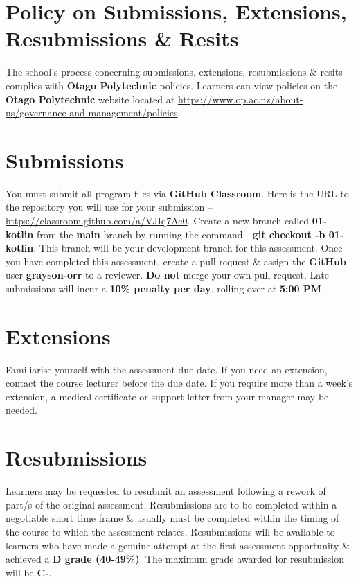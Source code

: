 \documentclass{article}
\begin{document}
\section*{Policy on Submissions, Extensions, Resubmissions \& Resits}
The school's process concerning submissions, extensions, resubmissions \& resits complies with \textbf{Otago Polytechnic} policies. Learners can view policies on the \textbf{Otago Polytechnic} website located at \href{https://www.op.ac.nz/about-us/governance-and-management/policies}{https://www.op.ac.nz/about-us/governance-and-management/policies}.

\section*{Submissions}
You must submit all program files via \textbf{GitHub Classroom}. Here is the URL to the repository you will use for your submission – \href{https://classroom.github.com/a/VJIq7Ae0}{https://classroom.github.com/a/VJIq7Ae0}. Create a new branch called  \textbf{01-kotlin} from the \textbf{main} branch by running the command - \textbf{git checkout -b 01-kotlin}. This branch will be your development branch for this assessment. Once you have completed this assessment, create a pull request \& assign the \textbf{GitHub} user \textbf{grayson-orr} to a reviewer. \textbf{Do not} merge your own pull request. Late submissions will incur a \textbf{10\% penalty per day}, rolling over at \textbf{5:00 PM}.

\section*{Extensions}
Familiarise yourself with the assessment due date. If you need an extension, contact the course lecturer before the due date. If you require more than a week's extension, a medical certificate or support letter from your manager may be needed.

\section*{Resubmissions}
Learners may be requested to resubmit an assessment following a rework of part/s of the original assessment. Resubmissions are to be completed within a negotiable short time frame \& usually must be completed within the timing of the course to which the assessment relates. Resubmissions will be available to learners who have made a genuine attempt at the first assessment opportunity \& achieved a \textbf{D grade (40-49\%)}. The maximum grade awarded for resubmission will be \textbf{C-}.
\end{document}
